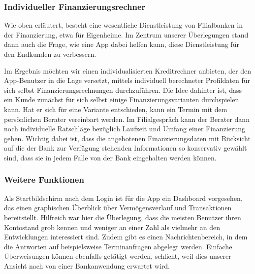 \subsubsection{Individueller Finanzierungsrechner}
	Wie oben erläutert, besteht eine wesentliche Dienstleistung von Filialbanken in der Finanzierung, etwa für Eigenheime. Im Zentrum unserer Überlegungen stand dann auch die Frage, wie eine App dabei helfen kann, diese Dienstleistung für den Endkunden zu verbessern.
	
	Im Ergebnis möchten wir einen individualisierten Kreditrechner anbieten, der den App-Benutzer in die Lage versetzt, mittels individuell berechneter Profildaten für sich selbst Finanzierungsrechnungen durchzuführen. Die Idee dahinter ist, dass ein Kunde zunächst für sich selbst einige Finanzierungsvarianten durchspielen kann. Hat er sich für eine Variante entschieden, kann ein Termin mit dem persönlichen Berater vereinbart werden. Im Filialgespräch kann der Berater dann noch individuelle Ratschläge bezüglich Laufzeit und Umfang einer Finanzierung geben. Wichtig dabei ist, dass die angebotenen Finanzierungsdaten  mit Rücksicht auf die der Bank zur Verfügung stehenden Informationen so konservativ gewählt sind, dass sie in jedem Falle von der Bank eingehalten werden können.
 
\subsubsection{Weitere Funktionen}
    Als Startbildschirm nach dem Login ist für die App ein Dashboard vorgesehen, das einen graphischen Überblick über Vermögensverlauf und Transaktionen bereitstellt. Hilfreich war hier die Überlegung, dass die meisten Benutzer ihren Kontostand grob kennen und weniger an einer Zahl als vielmehr an den Entwicklungen interessiert sind. Zudem gibt es einen Nachrichtenbereich, in dem die Antworten auf beispielsweise Terminanfragen abgelegt werden. Einfache Überweisungen können ebenfalls getätigt werden, schlicht, weil dies unserer Ansicht nach von einer Bankanwendung erwartet wird.
    